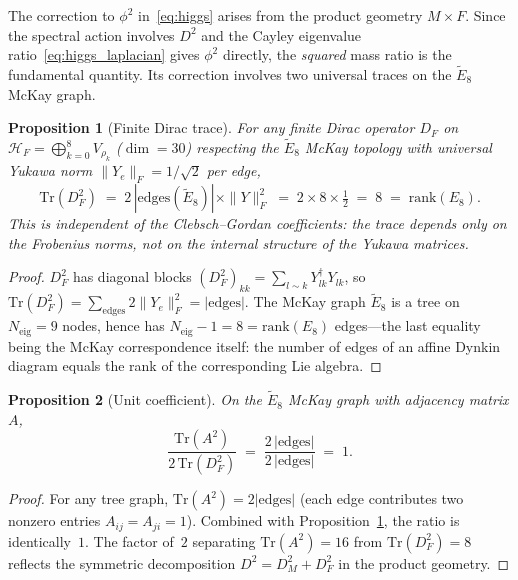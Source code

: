 \documentclass[12pt,a4paper]{article}
\newtheorem{proposition}{Proposition}
\theoremstyle{definition}
\begin{document}
The correction to $\phi^2$ in~\eqref{eq:higgs} arises from the product geometry $M \times F$.  Since the spectral action involves $D^2$ and the Cayley eigenvalue ratio~\eqref{eq:higgs_laplacian} gives $\phi^2$ directly, the \emph{squared} mass ratio is the fundamental quantity.  Its correction involves two universal traces on the $\widetilde{E}_8$ McKay graph.

\begin{proposition}[Finite Dirac trace]\label{prop:trdf2}
For any finite Dirac operator $D_F$ on $\mathcal{H}_F = \bigoplus_{k=0}^{8} V_{\rho_k}$ ($\dim = 30$) respecting the $\widetilde{E}_8$ McKay topology with universal Yukawa norm $\|Y_e\|_F = 1/\sqrt{2}$ per edge,
\[
\mathrm{Tr}(D_F^2) \;=\; 2\,|\mathrm{edges}(\widetilde{E}_8)|\times \|Y\|_F^2 \;=\; 2 \times 8 \times \tfrac{1}{2} \;=\; 8 \;=\; \mathrm{rank}(E_8).
\]
This is independent of the Clebsch--Gordan coefficients: the trace depends only on the Frobenius norms, not on the internal structure of the Yukawa matrices.
\end{proposition}
\begin{proof}
$D_F^2$ has diagonal blocks $(D_F^2)_{kk} = \sum_{l\sim k} Y_{lk}^\dagger Y_{lk}$, so $\mathrm{Tr}(D_F^2) = \sum_{\text{edges}} 2\|Y_e\|_F^2 = |\text{edges}|$.  The McKay graph $\widetilde{E}_8$ is a tree on $N_{\text{eig}} = 9$ nodes, hence has $N_{\text{eig}} - 1 = 8 = \mathrm{rank}(E_8)$ edges---the last equality being the McKay correspondence itself: the number of edges of an affine Dynkin diagram equals the rank of the corresponding Lie algebra.
\end{proof}

\begin{proposition}[Unit coefficient]\label{prop:higgs_coeff}
On the $\widetilde{E}_8$ McKay graph with adjacency matrix $A$,
\[
\frac{\mathrm{Tr}(A^2)}{2\,\mathrm{Tr}(D_F^2)} \;=\; \frac{2\,|\mathrm{edges}|}{2\,|\mathrm{edges}|} \;=\; 1.
\]
\end{proposition}
\begin{proof}
For any tree graph, $\mathrm{Tr}(A^2) = 2|\mathrm{edges}|$ (each edge contributes two nonzero entries $A_{ij} = A_{ji} = 1$).  Combined with Proposition~\ref{prop:trdf2}, the ratio is identically~$1$.  The factor of~$2$ separating $\mathrm{Tr}(A^2) = 16$ from $\mathrm{Tr}(D_F^2) = 8$ reflects the symmetric decomposition $D^2 = D_M^2 + D_F^2$ in the product geometry.
\end{proof}
\end{document}
